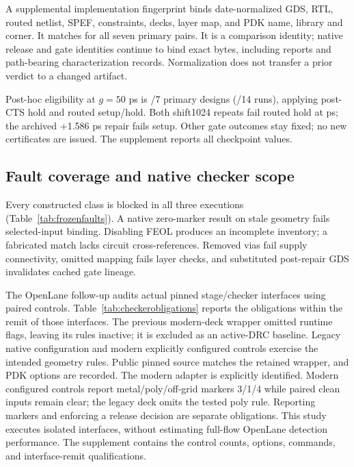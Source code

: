 \documentclass[runningheads]{llncs}
\begin{document}
A supplemental implementation fingerprint binds date-normalized GDS, RTL,
routed netlist, SPEF, constraints, decks, layer map, and PDK
name, library and corner. It matches for all seven primary pairs. It is a comparison
identity; native release and gate identities continue to bind exact bytes,
including reports and path-bearing characterization records. Normalization
does not transfer a prior verdict to a changed artifact.

Post-hoc eligibility at $g=50$ ps is \GuardbandPrimaryDesigns/7 primary designs
(\GuardbandPrimaryRuns/14 runs), applying post-CTS hold and routed setup/hold.
Both shift1024 repeats fail routed hold at \GuardbandShiftHoldPs{} ps;
the archived +1.586 ps repair fails setup. Other gate outcomes stay fixed;
no new certificates are issued. The supplement reports all checkpoint values.

\subsection{Fault coverage and native checker scope}
Every constructed class is blocked in all three executions
(Table~\ref{tab:frozenfaults}). A native zero-marker result on stale geometry
fails selected-input binding. Disabling FEOL produces an incomplete inventory;
a fabricated match lacks circuit cross-references. Removed vias fail supply
connectivity, omitted mapping fails layer checks, and substituted post-repair
GDS invalidates cached gate lineage.


The OpenLane follow-up audits actual pinned stage/checker interfaces using
paired controls. Table~\ref{tab:checkerobligations} reports the obligations
within the remit of those interfaces. The previous modern-deck wrapper omitted
runtime flags, leaving its rules inactive; it is excluded as an active-DRC
baseline. Legacy native configuration and modern explicitly configured
controls exercise the intended geometry rules. Public pinned source matches
the retained wrapper, and PDK options are recorded. The modern adapter is
explicitly identified.
Modern configured controls report metal/poly/off-grid markers 3/1/4 while
paired clean inputs remain clear; the legacy deck omits the tested poly rule.
Reporting markers and enforcing a release decision are separate
obligations. This study executes isolated interfaces, without estimating
full-flow OpenLane detection performance. The supplement contains the control
counts, options, commands, and interface-remit qualifications.

\end{document}
